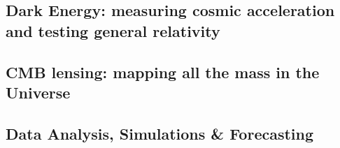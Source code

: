 

\subsection*{Dark Energy: measuring cosmic acceleration and testing general relativity}



\subsection*{CMB lensing: mapping all the mass in the Universe}



\subsection*{Data Analysis, Simulations \& Forecasting}



\eject






 
